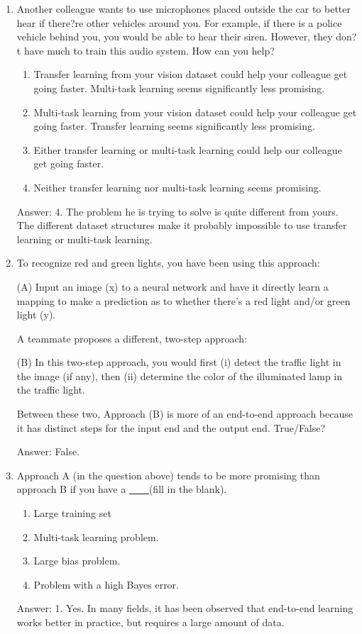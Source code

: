 \documentclass[12pt]{article}
\numberwithin{equation}{section}
\begin{document}
\begin{enumerate}
	\item Another colleague wants to use microphones placed outside the car to better hear if there?re other vehicles around you. For example, if there is a police vehicle behind you, you would be able to hear their siren. However, they don?t have much to train this audio system. How can you help?
	\begin{enumerate}
		\item Transfer learning from your vision dataset could help your colleague get going faster. Multi-task learning seems significantly less promising.
		\item Multi-task learning from your vision dataset could help your colleague get going faster. Transfer learning seems significantly less promising.
		\item Either transfer learning or multi-task learning could help our colleague get going faster.
		\item Neither transfer learning nor multi-task learning seems promising.
	\end{enumerate}
	Answer: 4. The problem he is trying to solve is quite different from yours. The different dataset structures make it probably impossible to use transfer learning or multi-task learning.
	\item To recognize red and green lights, you have been using this approach: \par
	(A) Input an image (x) to a neural network and have it directly learn a mapping to make a prediction as to whether there's a red light and/or green light (y). \par
A teammate proposes a different, two-step approach:\par
	(B) In this two-step approach, you would first (i) detect the traffic light in the image (if any), then (ii) determine the color of the illuminated lamp in the traffic light.\par
	Between these two, Approach (B) is more of an end-to-end approach because it has distinct steps for the input end and the output end. True/False? \par
	Answer: False.
	\item Approach A (in the question above) tends to be more promising than approach B if you have a \underline{    \  \  \  \  }(fill in the blank).
	\begin{enumerate}
		\item Large training set
		\item Multi-task learning problem.
		\item Large bias problem.
		\item Problem with a high Bayes error.
	\end{enumerate}
	Answer: 1. Yes. In many fields, it has been observed that end-to-end learning works better in practice, but requires a large amount of data.
\end{enumerate}
\renewcommand\refname{Reference}


\clearpage
\end{document}
